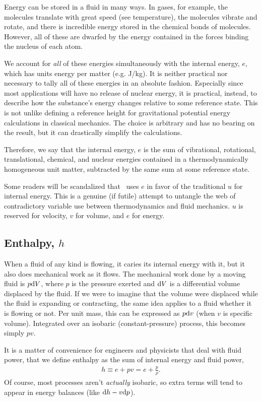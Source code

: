 Energy can be stored in a fluid in many ways.  In gases, for example, the molecules translate with great speed (see temperature), the molecules vibrate and rotate, and there is incredible energy stored in the chemical bonds of molecules.  However, all of these are dwarfed by the energy contained in the forces binding the nucleus of each atom.

We account for \emph{all} of these energies simultaneously with the internal energy, $e$, which has units energy per matter (e.g. J/kg).  It is neither practical nor necessary to tally all of these energies in an absolute fashion.  Especially since most applications will have no release of nuclear energy, it is practical, instead, to describe how the substance's energy changes relative to some reference state.  This is not unlike defining a reference height for gravitational potential energy calculations in classical mechanics.  The choice is arbitrary and has no bearing on the result, but it can drastically simplify the calculations.

Therefore, we say that the internal energy, $e$ is the sum of vibrational, rotational, translational, chemical, and nuclear energies contained in a thermodynamically homogeneous unit matter, subtracted by the same sum at some reference state.

Some readers will be scandalized that \PM\ uses $e$ in favor of the traditional $u$ for internal energy.  This is a genuine (if futile) attempt to untangle the web of contradictory variable use between thermodynamics and fluid mechanics.  $u$ is reserved for velocity, $v$ for volume, and $e$ for energy.

\subsection{Enthalpy, $h$}\label{sec:intro:h}

When a fluid of any kind is flowing, it caries its internal energy with it, but it also does mechanical work as it flows.  The mechanical work done by a moving fluid is $p \mathrm{d} V$, where $p$ is the pressure exerted and $\mathrm{d} V$ is a differential volume displaced by the fluid.  If we were to imagine that the volume were displaced while the fluid is expanding or contracting, the same idea applies to a fluid whether it is flowing or not.  Per unit mass, this can be expressed as $p \mathrm{d} v$ (when $v$ is specific volume).  Integrated over an isobaric (constant-pressure) process, this becomes simply $p v$.

It is a matter of convenience for engineers and physicists that deal with fluid power, that we define enthalpy as the sum of internal energy and fluid power,
\begin{align}
h \equiv e + pv = e + \frac{p}{\rho}.\label{eqn:intro:h}
\end{align}
Of course, most processes aren't \emph{actually} isobaric, so extra terms will tend to appear in energy balances (like $\mathrm{d} h - v \mathrm{d} p$).

